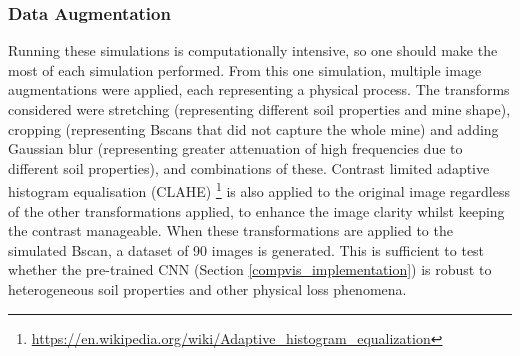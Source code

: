     \subsubsection{Data Augmentation}
    
      Running these simulations is computationally intensive, so one should make the most of each simulation performed. From this one simulation, multiple image augmentations were applied, each representing a physical process. The transforms considered were stretching (representing different soil properties and mine shape), cropping (representing Bscans that did not capture the whole mine) and adding Gaussian blur (representing greater attenuation of high frequencies due to different soil properties), and combinations of these. Contrast limited adaptive histogram equalisation (CLAHE) \footnote{\url{https://en.wikipedia.org/wiki/Adaptive_histogram_equalization}} is also applied to the original image regardless of the other transformations applied, to enhance the image clarity whilst keeping the contrast manageable. When these transformations are applied to the simulated Bscan, a dataset of 90 images is generated. This is sufficient to test whether the pre-trained CNN (Section \ref{compvis_implementation}) is robust to heterogeneous soil properties and other physical loss phenomena.
        
